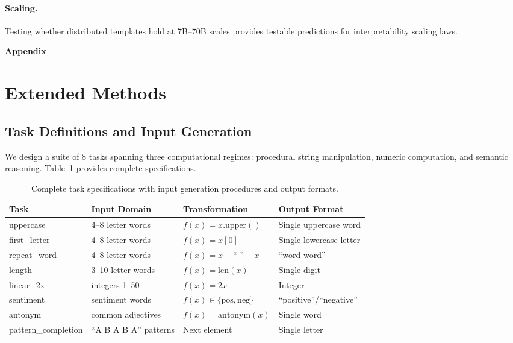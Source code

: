\documentclass{article}
\begin{document}
\paragraph{Scaling.} Testing whether distributed templates hold at 7B--70B scales provides testable predictions for interpretability scaling laws.

\newpage
\appendix
\begin{center}
\Large\textbf{Appendix}
\end{center}
\vspace{1em}

\section{Extended Methods}
\label{app:methods}

\subsection{Task Definitions and Input Generation}

We design a suite of 8 tasks spanning three computational regimes: procedural string manipulation, numeric computation, and semantic reasoning. Table~\ref{tab:task_details} provides complete specifications.

\begin{table}[h]
\centering
\small
\caption{Complete task specifications with input generation procedures and output formats.}
\label{tab:task_details}
\begin{tabular}{@{}llll@{}}
\toprule
Task & Input Domain & Transformation & Output Format \\
\midrule
uppercase & 4--8 letter words & $f(x) = x.\text{upper}()$ & Single uppercase word \\
first\_letter & 4--8 letter words & $f(x) = x[0]$ & Single lowercase letter \\
repeat\_word & 4--8 letter words & $f(x) = x + \text{`` ''} + x$ & ``word word'' \\
length & 3--10 letter words & $f(x) = \text{len}(x)$ & Single digit \\
linear\_2x & integers 1--50 & $f(x) = 2x$ & Integer \\
sentiment & sentiment words & $f(x) \in \{\text{pos}, \text{neg}\}$ & ``positive''/``negative'' \\
antonym & common adjectives & $f(x) = \text{antonym}(x)$ & Single word \\
pattern\_completion & ``A B A B A'' patterns & Next element & Single letter \\
\bottomrule
\end{tabular}
\end{table}
\end{document}
